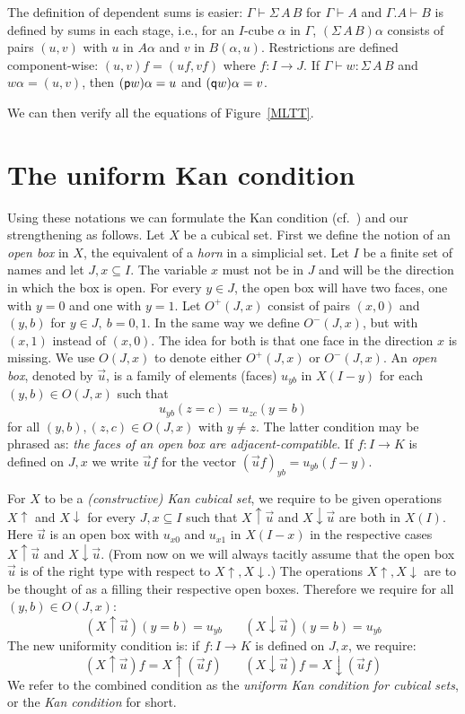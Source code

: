 \documentclass[10pt,a4paper]{article}
\newcommand{\pp}{{\sf p}}
\newcommand{\qq}{{\sf q}}
\newcommand{\rup}[1]{#1{\uparrow}}
\newcommand{\rdo}[1]{#1{\downarrow}}
\begin{document}
The definition of dependent sums is easier: $\Gamma\vdash\Sigma\,A\,B$
for $\Gamma \vdash A$ and $\Gamma.A \vdash B$ is defined by sums in
each stage, i.e., for an $I$-cube $\alpha$ in $\Gamma$,
$(\Sigma\,A\,B)\alpha$ consists of pairs $(u,v)$ with $u$ in $A
\alpha$ and $v$ in $B (\alpha, u)$.  Restrictions are defined
component-wise: $(u,v)f = (u f, v f)$ where $f \colon I \to J$.  If
$\Gamma \vdash w : \Sigma\,A\,B$ and $w \alpha = (u,v)$, then $(\pp w)
\alpha = u$ and $(\qq w) \alpha = v$.

We can then verify all the equations of Figure~\ref{MLTT}.

\section{The uniform Kan condition}

Using these notations we can formulate the Kan condition (cf.\
\cite{Kan}) and our strengthening as follows. Let $X$ be a cubical
set.  First we define the notion of an \emph{open box} in $X$, the
equivalent of a \emph{horn} in a simplicial set.  Let $I$ be a finite
set of names and let $J,x \subseteq I$.  The variable $x$ must not be
in $J$ and will be the direction in which the box is open.  For every
$y\in J$, the open box will have two faces, one with $y=0$ and one
with $y=1$.  Let $O^+(J,x)$ consist of pairs $(x,0)$ and $(y,b)$ for
$y\in J,~b=0,1$.  In the same way we define $O^-(J,x)$, but with
$(x,1)$ instead of $(x,0)$.  The idea for both is that one face in the
direction $x$ is missing.  We use $O(J,x)$ to denote either $O^+(J,x)$
or $O^-(J,x)$.  An \emph{open box}, denoted by $\vec u$, is a family
of elements (faces) $u_{yb}$ in $X(I-y)$ for each $(y,b)\in O(J,x)$
such that
$$u_{yb}(z = c) = u_{zc}(y = b)$$
for all $(y,b),(z,c)\in O(J,x)$ with $y\neq z$.  The latter condition
may be phrased as: \emph{the faces of an open box are
  adjacent-compatible}.  If $f:I\to K$ is defined on $J,x$ we write
$\vec u f$ for the vector $(\vec u f)_{yb} = u_{yb} (f-y)$.

For $X$ to be a \emph{(constructive) Kan cubical set}, we require to
be given operations $\rup{X}$ and $\rdo{X}$ for every $J,x\subseteq I$
such that $\rup{X} \vec u$ and $\rdo{X} \vec u$ are both in $X(I)$.
Here $\vec u$ is an open box with $u_{x0}$ and $u_{x1}$ in $X(I-x)$ in
the respective cases $\rup{X} \vec u$ and $\rdo{X} \vec u$. (From now
on we will always tacitly assume that the open box $\vec u$ is of the
right type with respect to $\rup{X},\rdo{X}$.)  The operations
$\rup{X},\rdo{X}$ are to be thought of as a filling their respective
open boxes. Therefore we require for all $(y,b)\in O(J,x)$:
$$
(\rup{X} \vec u) (y=b) = u_{yb}~~~~~~~~(\rdo{X} \vec u) (y=b) = u_{yb}
$$
The new uniformity condition is: if $f:I\to K$ is defined on $J,x$, we
require:
$$
(\rup{X} \vec u) f = \rup{X} (\vec{u}f)~~~~~~~~(\rdo{X} \vec u) f = \rdo{X} (\vec{u}f)
$$
We refer to the combined condition as the \emph{uniform Kan condition
  for cubical sets}, or the \emph{Kan condition} for
short. %
\end{document}
